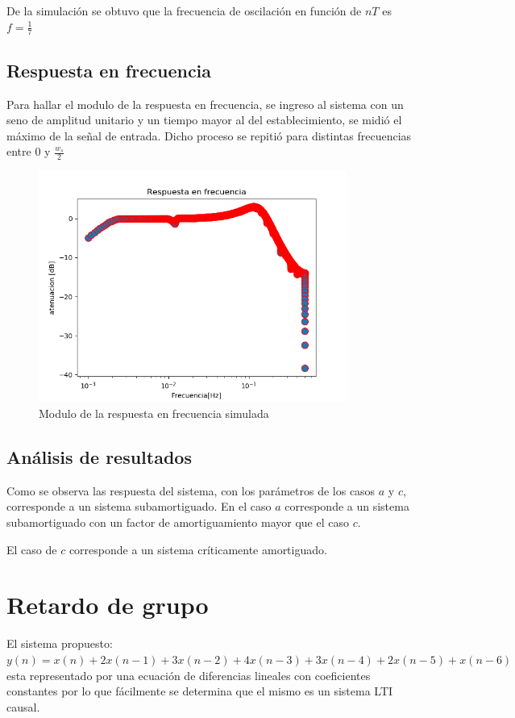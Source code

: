 \documentclass[../../ASSD_TP1_G7.tex]{subfiles}
\begin{document}
De la simulación se obtuvo que la frecuencia de oscilación en función de $nT$ es $f= \frac{1}{7}$
\subsection*{Respuesta en frecuencia}
Para hallar el modulo de la respuesta en frecuencia, se ingreso al sistema con un seno de amplitud unitario y un tiempo mayor al del establecimiento, se midió el máximo de la se\~nal de entrada. Dicho proceso se repitió para distintas frecuencias entre 0 y $\frac{w_s}{2} $

\begin{figure}[H]
  \centering
   \includegraphics[width=0.9\textwidth]{figures/rtaFrec.png}
  \caption{Modulo de la respuesta en frecuencia simulada}
  \label{fig:rtaFrecFin}
\end{figure}
\subsection{Análisis de resultados}
Como se observa las respuesta del sistema, con los parámetros de los casos $a$ y $c$, corresponde a un sistema subamortiguado. En el caso $a$ corresponde a un sistema subamortiguado con un factor de amortiguamiento mayor que el caso $c$.
\par El caso de $c$ corresponde a un sistema críticamente amortiguado.






\section{Retardo de grupo}
El sistema propuesto: $y(n)=x(n)+2x(n-1)+3x(n-2)+4x(n-3)+3x(n-4)+2x(n-5)+x(n-6)$  esta representado por una ecuaci\'{o}n de diferencias lineales con coeficientes constantes por lo que fácilmente se determina que el mismo es un sistema LTI causal. 
\end{document}
